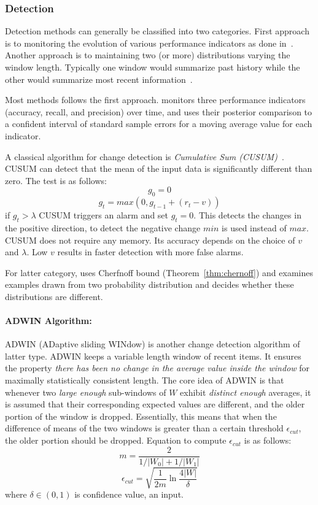 \subsubsection{Detection}
Detection methods can generally be classified into two categories. First approach is to monitoring the evolution of various performance indicators as done in~\cite{klinkenberg98:changedetection, zeira04:changedetection}. Another approach is to maintaining two (or more) distributions varying the window length. Typically one window would summarize past history while the other would summarize most recent information~\cite{kifer04:condrift}.

Most methods follows the first approach. \cite{klinkenberg98:changedetection} monitors three performance indicators (accuracy, recall, and precision) over time, and uses their posterior comparison to a confident interval of standard sample errors for a moving average value for each indicator.

A classical algorithm for change detection is \textit{Cumulative Sum (CUSUM)}~\cite{page54:cusum}. CUSUM can detect that the mean of the input data is significantly different than zero. The test is as follows:
\[
    g_0 = 0 
\]\[
    g_t = max (0, g_{t-1} + (r_t - v))
\]
if $g_t > \lambda$ CUSUM triggers an alarm and set $g_t = 0$. This detects the changes in the positive direction, to detect the negative change $min$ is used instead of $max$. CUSUM does not require any memory. Its accuracy depends on the choice of $v$ and $\lambda$. Low $v$ results in faster detection with more false alarms.

For latter category, \cite{kifer04:condrift} uses Cherfnoff bound (Theorem~\ref{thm:chernoff}) and examines examples drawn from two probability distribution and decides whether these distributions are different.

\paragraph{ADWIN Algorithm:} ADWIN (ADaptive sliding WINdow) is another change detection algorithm of latter type. ADWIN keeps a variable length window of recent items. It ensures the property {\it there has been no change in the average value inside the window} for maximally statistically consistent length. The core idea of ADWIN is that whenever two {\it large enough} sub-windows of $W$ exhibit {\it distinct enough} averages, it is assumed that their corresponding expected values are different, and the older portion of the window is dropped. Essentially, this means that when the difference of means of the two windows is greater than a certain threshold $\epsilon_{cut}$, the older portion should be dropped. Equation to compute $\epsilon_{cut}$ is as follows:
\[
    m = \frac{2}{1/|W_0| + 1/|W_1|}
\]\[
    \epsilon_{cut} = \sqrt{\frac{1}{2m} \ln \frac{4 |W|}{\delta}}
\]
where $\delta \in (0, 1)$ is confidence value, an input.

